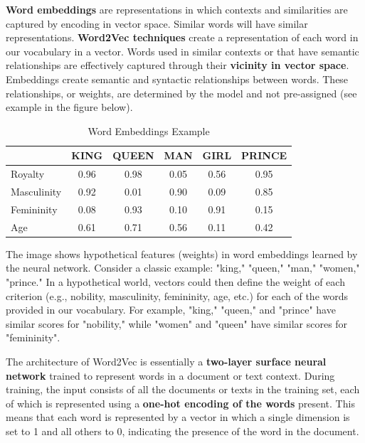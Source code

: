 \textbf{Word embeddings} are representations in which contexts and similarities are captured by encoding in vector space. Similar words will have similar representations. \textbf{Word2Vec techniques} create a representation of each word in our vocabulary in a vector. Words used in similar contexts or that have semantic relationships are effectively captured through their \textbf{vicinity in vector space}. Embeddings create semantic and syntactic relationships between words. These relationships, or weights, are determined by the model and not pre-assigned (see example in the figure below).
  
\begin{table}[h]
\centering
\begin{tabular}{|l|c|c|c|c|c|}
\hline
 & KING & QUEEN & MAN & GIRL & PRINCE \\
\hline
Royalty & \cellcolor{mygreen!25}0.96 & \cellcolor{mygreen!25}0.98 & \cellcolor{myblue!20}0.05 & \cellcolor{myblue!20}0.56 & \cellcolor{mygreen!25}0.95 \\
\hline
Masculinity & \cellcolor{myred!20}0.92 & \cellcolor{myorange!20}0.01 & \cellcolor{myred!20}0.90 & \cellcolor{myorange!20}0.09 & \cellcolor{myred!20}0.85 \\
\hline
Femininity & \cellcolor{myorange!20}0.08 & \cellcolor{myred!20}0.93 & \cellcolor{myorange!20}0.10 & \cellcolor{myred!20}0.91 & \cellcolor{myorange!20}0.15 \\
\hline
Age & \cellcolor{myblue!20}0.61 & \cellcolor{myblue!20}0.71 & \cellcolor{myblue!20}0.56 & \cellcolor{myblue!20}0.11 & \cellcolor{myorange!20}0.42 \\
\hline
\end{tabular} \caption{Word Embeddings Example}
\end{table}

The image shows hypothetical features (weights) in word embeddings learned by the neural network. Consider a classic example: "king," "queen," "man," "women," "prince." In a hypothetical world, vectors could then define the weight of each criterion (e.g., nobility, masculinity, femininity, age, etc.) for each of the words provided in our vocabulary. For example, "king," "queen," and "prince" have similar scores for "nobility," while "women" and "queen" have similar scores for "femininity".

The architecture of Word2Vec is essentially a \textbf{two-layer surface neural network} trained to represent words in a document or text context. During training, the input consists of all the documents or texts in the training set, each of which is represented using a \textbf{one-hot encoding of the words} present. This means that each word is represented by a vector in which a single dimension is set to 1 and all others to 0, indicating the presence of the word in the document.

